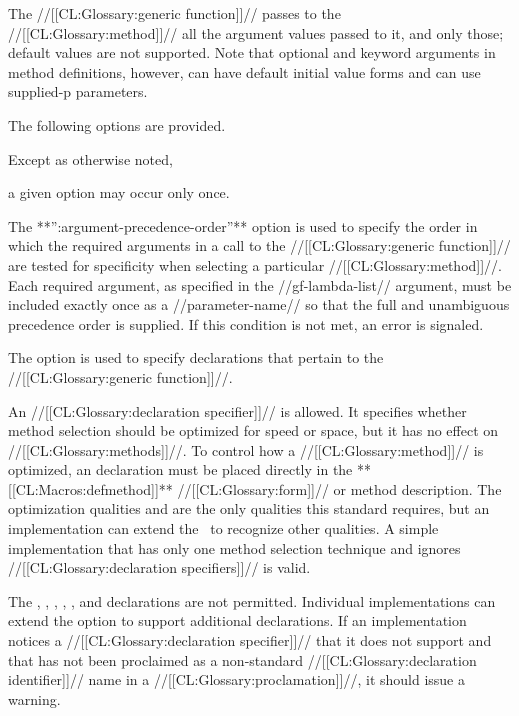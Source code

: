 The //[[CL:Glossary:generic function]]// passes to the //[[CL:Glossary:method]]// all the argument values passed to it, and only those; default values are not supported. Note that optional and keyword arguments in method definitions, however, can have default initial value forms and can use supplied-p parameters.

The following options are provided.

Except as otherwise noted,

a given option may occur only once.

\beginlist

\itemitem{\bull} The **'':argument-precedence-order''** option is used to specify the order in which the required arguments in a call to the //[[CL:Glossary:generic function]]// are tested for specificity when selecting a particular //[[CL:Glossary:method]]//. Each required argument, as specified in the //gf-lambda-list// argument, must be included exactly once as a //parameter-name// so that the full and unambiguous precedence order is supplied. If this condition is not met, an error is signaled. 

\itemitem{\bull} The  option is used to specify declarations that pertain to the //[[CL:Glossary:generic function]]//.

An  //[[CL:Glossary:declaration specifier]]// is allowed. It specifies whether method selection should be optimized for speed or space, but it has no effect on //[[CL:Glossary:methods]]//. To control how a //[[CL:Glossary:method]]// is optimized, an  declaration must be placed directly in the **[[CL:Macros:defmethod]]** //[[CL:Glossary:form]]// or method description. The optimization qualities  and  are the only qualities this standard requires, but an implementation can extend the \CLOS\ to recognize other qualities. A simple implementation that has only one method selection technique and ignores  //[[CL:Glossary:declaration specifiers]]// is valid.

The , , , , , and  declarations are not permitted. Individual implementations can extend the  option to support additional declarations.  If an implementation notices a //[[CL:Glossary:declaration specifier]]// that it does not support and that has not been proclaimed as a non-standard //[[CL:Glossary:declaration identifier]]// name in a  //[[CL:Glossary:proclamation]]//, it should issue a warning. 

